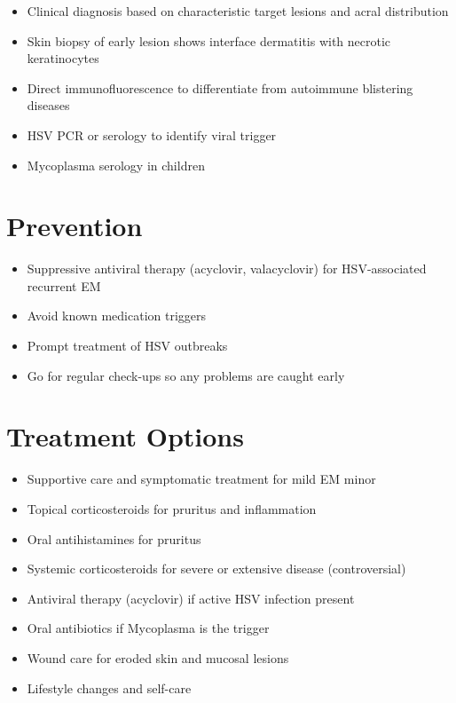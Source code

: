 \begin{itemize}[noitemsep]
  \item Clinical diagnosis based on characteristic target lesions and acral distribution
  \item Skin biopsy of early lesion shows interface dermatitis with necrotic keratinocytes
  \item Direct immunofluorescence to differentiate from autoimmune blistering diseases
  \item HSV PCR or serology to identify viral trigger
  \item Mycoplasma serology in children
\end{itemize}

\section{Prevention}

\begin{itemize}[noitemsep]
  \item Suppressive antiviral therapy (acyclovir, valacyclovir) for HSV-associated recurrent EM
  \item Avoid known medication triggers
  \item Prompt treatment of HSV outbreaks
  \item Go for regular check-ups so any problems are caught early
\end{itemize}

\section{Treatment Options}

\begin{itemize}[noitemsep]
  \item Supportive care and symptomatic treatment for mild EM minor
  \item Topical corticosteroids for pruritus and inflammation
  \item Oral antihistamines for pruritus
  \item Systemic corticosteroids for severe or extensive disease (controversial)
  \item Antiviral therapy (acyclovir) if active HSV infection present
  \item Oral antibiotics if Mycoplasma is the trigger
  \item Wound care for eroded skin and mucosal lesions
  \item Lifestyle changes and self-care
\end{itemize}

